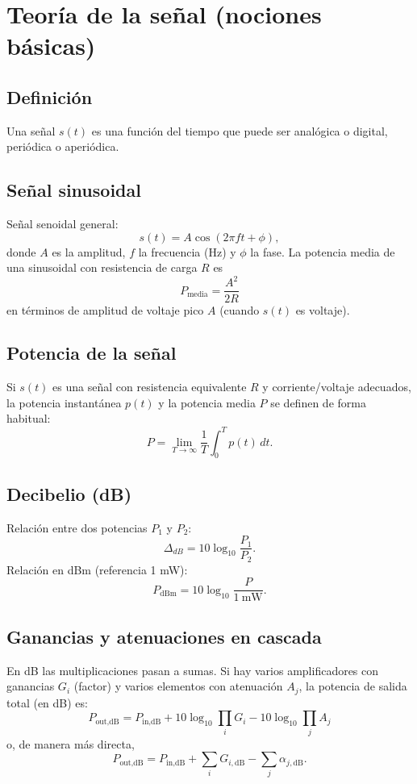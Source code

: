 \documentclass[11pt,a4paper]{article}
\newcommand{\dB}{\mathrm{dB}}
\begin{document}
\section{Teoría de la señal (nociones básicas)}
\subsection{Definición}
Una señal $s(t)$ es una función del tiempo que puede ser analógica o digital, periódica o aperiódica.

\subsection{Señal sinusoidal}
Señal senoidal general:
\[
s(t)=A\cos(2\pi f t + \phi),
\]
donde $A$ es la amplitud, $f$ la frecuencia (Hz) y $\phi$ la fase. La potencia media de una sinusoidal con resistencia de carga $R$ es
\[
P_\text{media}=\frac{A^2}{2R}
\]
en términos de amplitud de voltaje pico $A$ (cuando $s(t)$ es voltaje).

\subsection{Potencia de la señal}
Si $s(t)$ es una señal con resistencia equivalente $R$ y corriente/voltaje adecuados, la potencia instantánea $p(t)$ y la potencia media $P$ se definen de forma habitual:
\[
P=\lim_{T\to\infty}\frac{1}{T}\int_0^{T} p(t)\,dt.
\]

\subsection{Decibelio (dB)}
Relación entre dos potencias $P_1$ y $P_2$:
\[
\Delta_{dB} = 10\log_{10}\frac{P_1}{P_2}.
\]
Relación en dBm (referencia 1 mW):
\[
P_{\text{dBm}} = 10\log_{10}\frac{P}{1\ \text{mW}}.
\]

\subsection{Ganancias y atenuaciones en cascada}
En dB las multiplicaciones pasan a sumas. Si hay varios amplificadores con ganancias $G_i$ (factor) y varios elementos con atenuación $A_j$, la potencia de salida total (en dB) es:
\[
P_\text{out,dB} = P_\text{in,dB} + 10\log_{10}\prod_i G_i - 10\log_{10}\prod_j A_j
\]
o, de manera más directa,
\[
P_\text{out,dB} = P_\text{in,dB} + \sum_i G_{i,\dB} - \sum_j \alpha_{j,\dB}.
\]

\end{document}
